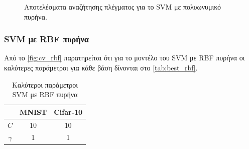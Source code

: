 \documentclass[a4paper]{article}
\begin{document}
\begin{figure}[H]
    \caption{Αποτελέσματα αναζήτησης πλέγματος για το SVM με πολυωνυμικό
    πυρήνα.}
    \label{fig:cv_poly}
\end{figure}


\subsubsection{SVM με RBF πυρήνα}

Από το \autoref{fig:cv_rbf} παρατηρείται ότι για το μοντέλο του SVM με RBF
πυρήνα οι καλύτερες παράμετροι για κάθε βάση δίνονται στο
\autoref{tab:best_rbf}.

\begin{table}[h]
\centering
\begin{tabular}{|c|c|c|}
\hline
         & MNIST & Cifar-10 \\ \hline
$C$      & 10    & 10       \\ \hline
$\gamma$ & 1     & 1        \\ \hline
\end{tabular}
\caption{Καλύτεροι παράμετροι SVM με RBF πυρήνα}
\label{tab:best_rbf}
\end{table}
\end{document}
